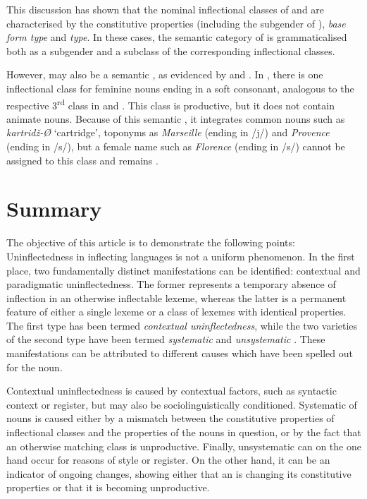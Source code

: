 \documentclass[output=paper,colorlinks,citecolor=brown]{langscibook}
\begin{document}
This discussion has shown that the nominal inflectional classes of  and  are characterised by the constitutive properties \emph{} (including the subgender of \emph{}), \emph{base form type} and \emph{ type}. In these cases, the semantic category of \emph{} is grammaticalised both as a subgender and a subclass of the corresponding inflectional classes.

However,  may also be a semantic , as evidenced by  and . In , there is one inflectional class for feminine nouns ending in a soft consonant, analogous to the respective 3\textsuperscript{rd} class in  and . This class is productive, but it does not contain animate nouns. Because of this semantic , it integrates common nouns such as \emph{kartridž-Ø} `cartridge', toponyms as \emph{Marseille} (ending in /j/) and \emph{Provence} (ending in /s/), but a female name such as \emph{Florence} (ending in /s/) cannot be assigned to this class and remains .

\section{Summary}

The objective of this article is to demonstrate the following points: Uninflectedness in inflecting languages is not a uniform phenomenon. In the first place, two fundamentally distinct manifestations can be identified: contextual and paradigmatic uninflectedness. The former represents a temporary absence of inflection in an otherwise inflectable lexeme, whereas the latter is a permanent feature of either a single lexeme or a class of lexemes with identical properties. The first type has been termed \emph{contextual uninflectedness}, while the two varieties of the second type have been termed \emph{systematic} and \emph{unsystematic }. These manifestations can be attributed to different causes which have been spelled out for the noun.

Contextual uninflectedness is caused by contextual factors, such as syntactic context or register, but may also be sociolinguistically conditioned. Systematic  of nouns is caused either by a mismatch between the constitutive properties of inflectional classes and the properties of the nouns in question, or by the fact that an otherwise matching class is unproductive. Finally, unsystematic  can on the one hand occur for reasons of style or register. On the other hand, it can be an indicator of ongoing changes, showing either that an  is changing its constitutive properties or that it is becoming unproductive.
 
\end{document}
